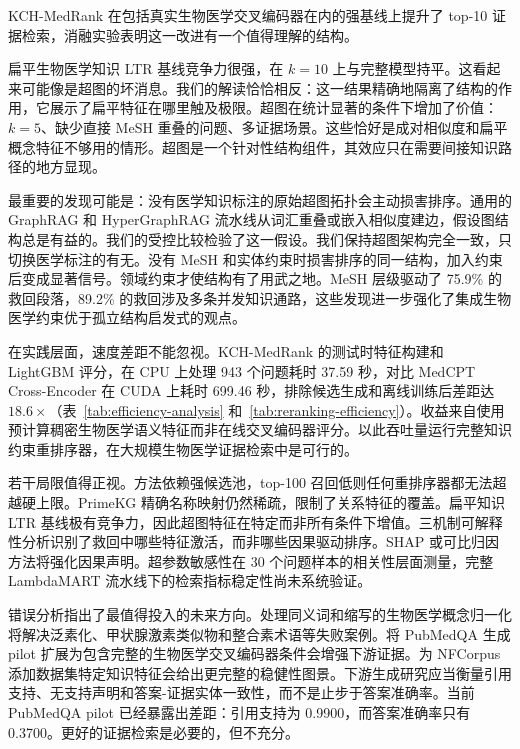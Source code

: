 KCH-MedRank 在包括真实生物医学交叉编码器在内的强基线上提升了 top-10 证据检索，消融实验表明这一改进有一个值得理解的结构。

扁平生物医学知识 LTR 基线竞争力很强，在 $k{=}10$ 上与完整模型持平。这看起来可能像是超图的坏消息。我们的解读恰恰相反：这一结果精确地隔离了结构的作用，它展示了扁平特征在哪里触及极限。超图在统计显著的条件下增加了价值：$k{=}5$、缺少直接 MeSH 重叠的问题、多证据场景。这些恰好是成对相似度和扁平概念特征不够用的情形。超图是一个针对性结构组件，其效应只在需要间接知识路径的地方显现。

最重要的发现可能是：没有医学知识标注的原始超图拓扑会主动损害排序。通用的 GraphRAG 和 HyperGraphRAG 流水线从词汇重叠或嵌入相似度建边，假设图结构总是有益的。我们的受控比较检验了这一假设。我们保持超图架构完全一致，只切换医学标注的有无。没有 MeSH 和实体约束时损害排序的同一结构，加入约束后变成显著信号。领域约束才使结构有了用武之地。MeSH 层级驱动了 75.9\% 的救回段落，89.2\% 的救回涉及多条并发知识通路，这些发现进一步强化了集成生物医学约束优于孤立结构启发式的观点。

在实践层面，速度差距不能忽视。KCH-MedRank 的测试时特征构建和 LightGBM 评分，在 CPU 上处理 943 个问题耗时 37.59 秒，对比 MedCPT Cross-Encoder 在 CUDA 上耗时 699.46 秒，排除候选生成和离线训练后差距达 $18.6\times$（表~\ref{tab:efficiency-analysis} 和~\ref{tab:reranking-efficiency}）。收益来自使用预计算稠密生物医学语义特征而非在线交叉编码器评分。以此吞吐量运行完整知识约束重排序器，在大规模生物医学证据检索中是可行的。




若干局限值得正视。方法依赖强候选池，top-100 召回低则任何重排序器都无法超越硬上限。PrimeKG 精确名称映射仍然稀疏，限制了关系特征的覆盖。扁平知识 LTR 基线极有竞争力，因此超图特征在特定而非所有条件下增值。三机制可解释性分析识别了救回中哪些特征激活，而非哪些因果驱动排序。SHAP 或可比归因方法将强化因果声明。超参数敏感性在 30 个问题样本的相关性层面测量，完整 LambdaMART 流水线下的检索指标稳定性尚未系统验证。

错误分析指出了最值得投入的未来方向。处理同义词和缩写的生物医学概念归一化将解决泛素化、甲状腺激素类似物和整合素术语等失败案例。将 PubMedQA 生成 pilot 扩展为包含完整的生物医学交叉编码器条件会增强下游证据。为 NFCorpus 添加数据集特定知识特征会给出更完整的稳健性图景。下游生成研究应当衡量引用支持、无支持声明和答案-证据实体一致性，而不是止步于答案准确率。当前 PubMedQA pilot 已经暴露出差距：引用支持为 0.9900，而答案准确率只有 0.3700。更好的证据检索是必要的，但不充分。
